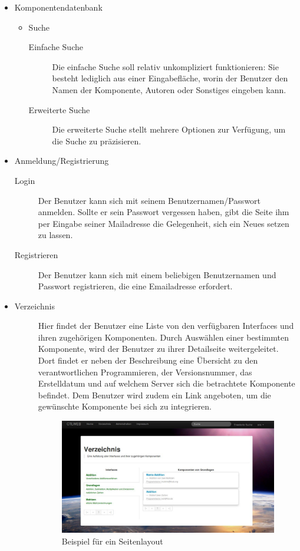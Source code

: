  \begin{itemize}
   \item Komponentendatenbank
   \begin{itemize}
    \item Suche
      \begin{description}
       \item[Einfache Suche] Die einfache Suche soll relativ unkompliziert funktionieren:
        Sie besteht lediglich aus einer Eingabefläche, worin der Benutzer
       den Namen der Komponente, Autoren oder Sonstiges eingeben kann. 
       \item[Erweiterte Suche] Die erweiterte Suche stellt mehrere Optionen zur Verfügung, um die Suche zu präzisieren. 
       \end{description}
    \end{itemize}
    \item Anmeldung/Registrierung
      \begin{description}
        \item[Login] Der Benutzer kann sich mit seinem Benutzernamen/Passwort anmelden. Sollte er sein Passwort vergessen haben, gibt die Seite ihm per Eingabe seiner Mailadresse die Gelegenheit, sich ein Neues setzen zu lassen.
        \item[Registrieren]Der Benutzer kann sich mit einem beliebigen Benutzernamen und Passwort registrieren, die eine Emailadresse erfordert. 
      \end{description}   
    \item 
      \begin{description}
        \item[Verzeichnis] Hier findet der Benutzer eine Liste von den verfügbaren Interfaces und ihren zugehörigen Komponenten.
        Durch Auswählen einer bestimmten Komponente, wird der Benutzer zu ihrer Detailseite weitergeleitet.
        Dort findet er neben der Beschreibung eine Übersicht zu den verantwortlichen Programmieren, der Versionsnummer, das Erstelldatum und auf welchem Server sich die betrachtete Komponente befindet. 
        Dem Benutzer wird zudem ein Link angeboten, um die gewünschte Komponente bei sich zu integrieren. 
      
      \begin{figure}[!htp]
      \includegraphics[width=0.8\linewidth]{bilder/ctlweb.pdf}
      \caption{Beispiel für ein Seitenlayout}
      \label{fig:gui}
      \end{figure}





\end{description}
\end{itemize}
